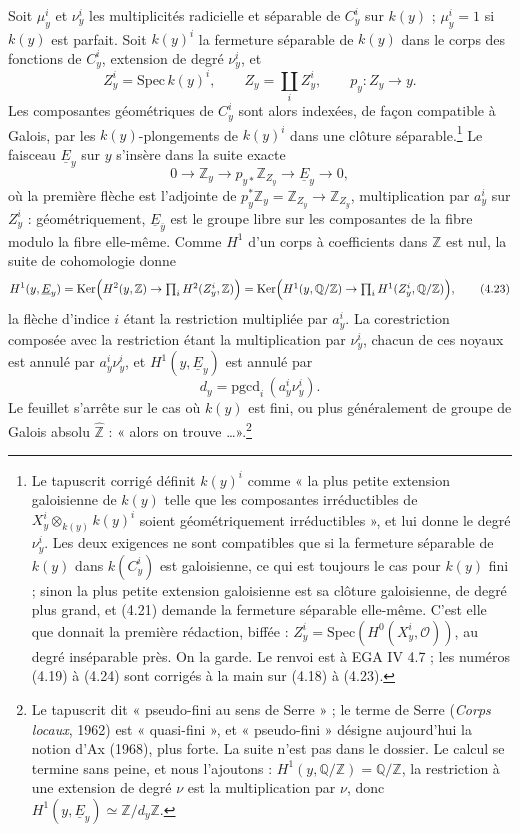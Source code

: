 \documentclass[11pt,a4paper]{article}
\begin{document}
Soit $\mu_{y}^{i}$ et $\nu_{y}^{i}$ les multiplicités radicielle et séparable
de $C_{y}^{i}$ sur $k(y)$ ; $\mu_{y}^{i} = 1$ si $k(y)$ est parfait. Soit
$k(y)^{i}$ la fermeture séparable de $k(y)$ dans le corps des fonctions de
$C_{y}^{i}$, extension de degré $\nu_{y}^{i}$, et
\[
  Z_{y}^{i} = \mathrm{Spec}\,k(y)^{i}, \qquad Z_{y} = \textstyle\coprod_{i}
  Z_{y}^{i}, \qquad p_{y} : Z_{y} \to y. \tag{4.20}
\]
Les composantes géométriques de $C_{y}^{i}$ sont alors indexées, de façon
compatible à Galois, par les $k(y)$-plongements de $k(y)^{i}$ dans une
clôture séparable.\footnote{Le tapuscrit corrigé définit $k(y)^{i}$ comme « la
plus petite extension galoisienne de $k(y)$ telle que les composantes
irréductibles de $X_{y}^{i} \otimes_{k(y)} k(y)^{i}$ soient géométriquement
irréductibles », et lui donne le degré $\nu_{y}^{i}$. Les deux exigences ne
sont compatibles que si la fermeture séparable de $k(y)$ dans
$k(C_{y}^{i})$ est galoisienne, ce qui est toujours le cas pour $k(y)$
fini ; sinon la plus petite extension galoisienne est sa clôture
galoisienne, de degré plus grand, et (4.21) demande la fermeture séparable
elle-même. C'est elle que donnait la première rédaction, biffée :
$Z_{y}^{i} = \mathrm{Spec}(H^{0}(X_{y}^{i},\mathcal{O}))$, au degré
inséparable près. On la garde. Le renvoi est à EGA IV 4.7 ; les numéros
(4.19) à (4.24) sont corrigés à la main sur (4.18) à (4.23).} Le faisceau
$\underline{E}_{y}$ sur $y$ s'insère dans la suite exacte
\[
  0 \to \mathbb{Z}_{y} \to p_{y*}\mathbb{Z}_{Z_{y}} \to \underline{E}_{y}
  \to 0, \tag{4.21}
\]
où la première flèche est l'adjointe de $p_{y}^{*}\mathbb{Z}_{y} =
\mathbb{Z}_{Z_{y}} \to \mathbb{Z}_{Z_{y}}$, multiplication par $a_{y}^{i}$
sur $Z_{y}^{i}$ : géométriquement, $\underline{E}_{\bar{y}}$ est le groupe
libre sur les composantes de la fibre modulo la fibre elle-même. Comme
$H^{1}$ d'un corps à coefficients dans $\mathbb{Z}$ est nul, la suite
de cohomologie donne
\[
  H^{1}(y,\underline{E}_{y}) = \mathrm{Ker}\Bigl(H^{2}(y,\mathbb{Z}) \to
  \textstyle\prod_{i} H^{2}(Z_{y}^{i},\mathbb{Z})\Bigr)
  = \mathrm{Ker}\Bigl(H^{1}(y,\mathbb{Q}/\mathbb{Z}) \to
  \textstyle\prod_{i} H^{1}(Z_{y}^{i},\mathbb{Q}/\mathbb{Z})\Bigr), \tag{4.23}
\]
la flèche d'indice $i$ étant la restriction multipliée par $a_{y}^{i}$. La
corestriction composée avec la restriction étant la multiplication par
$\nu_{y}^{i}$, chacun de ces noyaux est annulé par $a_{y}^{i}\nu_{y}^{i}$, et
$H^{1}(y,\underline{E}_{y})$ est annulé par
\[
  d_{y} = \mathrm{pgcd}_{i}\,(a_{y}^{i}\nu_{y}^{i}). \tag{4.24}
\]
Le feuillet s'arrête sur le cas où $k(y)$ est fini, ou plus généralement de
groupe de Galois absolu $\widehat{\mathbb{Z}}$ : « alors on trouve
\ldots ».\footnote{Le tapuscrit dit « pseudo-fini au sens de Serre » ; le
terme de Serre (\emph{Corps locaux}, 1962) est « quasi-fini », et
« pseudo-fini » désigne aujourd'hui la notion d'Ax (1968), plus forte. La
suite n'est pas dans le dossier. Le calcul se termine sans peine, et nous
l'ajoutons : $H^{1}(y,\mathbb{Q}/\mathbb{Z}) = \mathbb{Q}/\mathbb{Z}$,
la restriction à une extension de degré $\nu$ est la multiplication par
$\nu$, donc $H^{1}(y,\underline{E}_{y}) \simeq \mathbb{Z}/d_{y}\mathbb{Z}$.}
\end{document}
